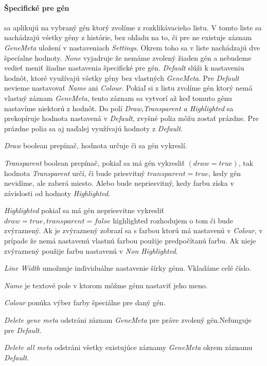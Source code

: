 \paragraph{Špecifické pre gén} sa aplikujú na vybraný gén ktorý zvolíme z rozklikávacieho listu.
V tomto liste sa nachádzajú vśetky gény z histórie, bez ohľadu na to, či pre ne existuje záznam \emph{GeneMeta} uložení v nastaveniach \emph{Settings}.
Okrem toho sa v liste nachádzajú dve špecíalne hodnoty. \emph{None} vyjadruje že nemáme zvolený žiaden gén a nebudeme vedieť meniť žiadne nastavenia špecifické pre gén.
\emph{Default} slúži k nastaveniu hodnôt, ktoré využívajú všetky gény bez vlastných \emph{GeneMeta}. Pre \emph{Default} nevieme nastavovať \emph{Name} ani \emph{Colour}.
Pokiaľ si z listu zvolíme gén ktorý nemá vlastný záznam \emph{GeneMeta}, tento záznam sa vytvorí až keď tomuto génu nastavíme niektorú z hodnôt.
Do polí \emph{Draw,Transparent a Highlighted} sa prekopíruje hodnota nastavená v \emph{Default}, zvyšné polia môžu zostať prázdne. Pre prázdne polia sa aj naďalej využívajú hodnoty z \emph{Default}.

\emph{Draw} boolean prepínač, hodnota určuje či sa gén vykreslí.

\emph{Transparent} boolean prepínač, pokiaľ sa má gén vykresliť $(draw=true)$, tak hodnota \emph{Transparent} určí, či bude priesvitný $transparent=true$, kedy gén nevidíme, ale zaberá miesto.
Alebo bude nepriesvitný, kedy farbu získa v závislosti od hodnoty \emph{Highlighted}.

\emph{Highlighted} pokiaľ sa má gén nepriesvitne vykresliť $draw=true,transparent=false$ highlighted rozhodujem o tom či bude zvýraznený.
Ak je zvýraznený zobrazí sa s farbou ktorú má nastavenú v \emph{Colour}, v prípade že nemá nastavenú vlastnú farbou použije predpočítanú farbu. Ak nieje zvýraznený použije farbu nastavenú v \emph{Non Highlighted}. 

\emph{Line Width} umožnuje individuálne nastavenie šírky génu. Vkladáme celé číslo.

\emph{Name} je textové pole v ktorom môžme génu nastaviť jeho meno.

\emph{Colour} ponúka výber farby špeciálne pre daný gén.

\emph{Delete gene meta} odstráni záznam \emph{GeneMeta} pre práve zvolený gén.Nefunguje pre \emph{Default}.

\emph{Delete all meta} odstráni všetky existujúce záznamy \emph{GeneMeta} okrem záznamu \emph{Default}.